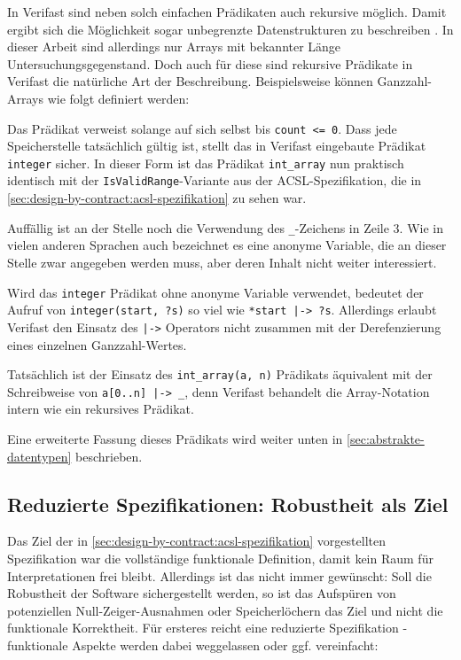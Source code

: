 In Verifast sind neben solch einfachen Prädikaten auch rekursive möglich. Damit ergibt sich die Möglichkeit
sogar unbegrenzte Datenstrukturen zu beschreiben . In dieser
Arbeit sind allerdings nur Arrays mit bekannter Länge Untersuchungsgegenstand. Doch auch für diese sind
rekursive Prädikate in Verifast die natürliche Art der Beschreibung. Beispielsweise können Ganzzahl-Arrays
wie folgt definiert werden:


 
Das Prädikat verweist solange auf sich selbst bis \lstinline{count <= 0}. Dass jede Speicherstelle tatsächlich
gültig ist, stellt das in Verifast eingebaute Prädikat \lstinline{integer} sicher. In dieser Form ist das Prädikat
\lstinline{int_array} nun praktisch identisch mit der \lstinline{IsValidRange}-Variante aus der ACSL-Spezifikation, 
die in \ref{sec:design-by-contract:acsl-spezifikation} zu sehen war.

Auffällig ist an der Stelle noch die Verwendung des \lstinline{_}-Zeichens in Zeile 3. Wie in vielen anderen 
Sprachen auch bezeichnet es eine anonyme Variable, die an dieser Stelle zwar angegeben werden muss, aber deren 
Inhalt nicht weiter interessiert. 

Wird das \lstinline{integer} Prädikat ohne anonyme Variable verwendet, bedeutet der Aufruf von 
\lstinline{integer(start, ?s)} so viel wie \lstinline{*start |-> ?s}. Allerdings erlaubt Verifast
den Einsatz des \lstinline{|->} Operators nicht zusammen mit der Derefenzierung eines einzelnen
Ganzzahl-Wertes.

Tatsächlich ist der Einsatz des \lstinline{int_array(a, n)} Prädikats äquivalent mit der Schreibweise 
von \lstinline{a[0..n] |-> _}, denn Verifast behandelt die Array-Notation intern wie ein rekursives
Prädikat.

Eine erweiterte Fassung dieses Prädikats wird weiter unten in 
\ref{sec:abstrakte-datentypen} beschrieben.



\subsection{Reduzierte Spezifikationen: Robustheit als Ziel}
\label{sec:design-by-contract:partielle-korrektheit}

Das Ziel der in \ref{sec:design-by-contract:acsl-spezifikation} vorgestellten Spezifikation war die
vollständige funktionale Definition, damit kein Raum für Interpretationen frei bleibt. Allerdings ist
das nicht immer gewünscht: Soll die Robustheit der Software sichergestellt werden, so ist das Aufspüren 
von potenziellen Null-Zeiger-Ausnahmen oder Speicherlöchern das Ziel und nicht die funktionale
Korrektheit. Für ersteres reicht eine reduzierte Spezifikation - funktionale Aspekte werden dabei 
weggelassen oder ggf. vereinfacht:


